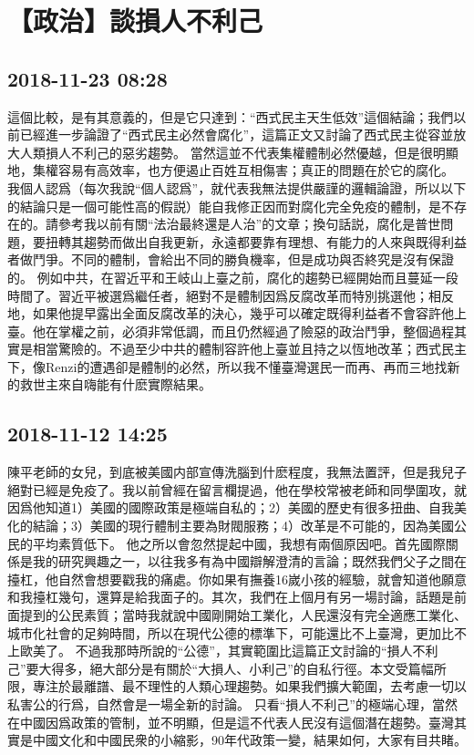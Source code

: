 \documentclass[twocolumn]{ctexart}
\begin{document}
\section*{【政治】談損人不利己}
\subsection*{2018-11-23 08:28}

這個比較，是有其意義的，但是它只達到：“西式民主天生低效”這個結論；我們以前已經進一步論證了“西式民主必然會腐化”，這篇正文又討論了西式民主從容並放大人類損人不利己的惡劣趨勢。 
當然這並不代表集權體制必然優越，但是很明顯地，集權容易有高效率，也方便遏止百姓互相傷害；真正的問題在於它的腐化。 
我個人認爲（每次我說“個人認爲”，就代表我無法提供嚴謹的邏輯論證，所以以下的結論只是一個可能性高的假説）能自我修正因而對腐化完全免疫的體制，是不存在的。請參考我以前有關“法治最終還是人治”的文章；換句話説，腐化是普世問題，要扭轉其趨勢而做出自我更新，永遠都要靠有理想、有能力的人來與既得利益者做鬥爭。不同的體制，會給出不同的勝負機率，但是成功與否終究是沒有保證的。 
例如中共，在習近平和王岐山上臺之前，腐化的趨勢已經開始而且蔓延一段時間了。習近平被選爲繼任者，絕對不是體制因爲反腐改革而特別挑選他；相反地，如果他提早露出全面反腐改革的決心，幾乎可以確定既得利益者不會容許他上臺。他在掌權之前，必須非常低調，而且仍然經過了險惡的政治鬥爭，整個過程其實是相當驚險的。不過至少中共的體制容許他上臺並且持之以恆地改革；西式民主下，像Renzi的遭遇卻是體制的必然，所以我不懂臺灣選民一而再、再而三地找新的救世主來自嗨能有什麽實際結果。
\subsection*{2018-11-12 14:25}

陳平老師的女兒，到底被美國内部宣傳洗腦到什麽程度，我無法置評，但是我兒子絕對已經是免疫了。我以前曾經在留言欄提過，他在學校常被老師和同學圍攻，就因爲他知道1）美國的國際政策是極端自私的；2）美國的歷史有很多扭曲、自我美化的結論；3）美國的現行體制主要為財閥服務；4）改革是不可能的，因為美國公民的平均素質低下。
他之所以會忽然提起中國，我想有兩個原因吧。首先國際關係是我的研究興趣之一，以往我多有為中國辯解澄清的言論；既然我們父子之間在擡杠，他自然會想要戳我的痛處。你如果有撫養16嵗小孩的經驗，就會知道他願意和我擡杠幾句，還算是給我面子的。其次，我們在上個月有另一場討論，話題是前面提到的公民素質；當時我就說中國剛開始工業化，人民還沒有完全適應工業化、城市化社會的足夠時間，所以在現代公德的標準下，可能還比不上臺灣，更加比不上歐美了。
不過我那時所說的“公德”，其實範圍比這篇正文討論的“損人不利己”要大得多，絕大部分是有關於“大損人、小利己”的自私行徑。本文受篇幅所限，專注於最離譜、最不理性的人類心理趨勢。如果我們擴大範圍，去考慮一切以私害公的行爲，自然會是一場全新的討論。
只看“損人不利己”的極端心理，當然在中國因爲政策的管制，並不明顯，但是這不代表人民沒有這個潛在趨勢。臺灣其實是中國文化和中國民衆的小縮影，90年代政策一變，結果如何，大家有目共睹。
\end{document}
